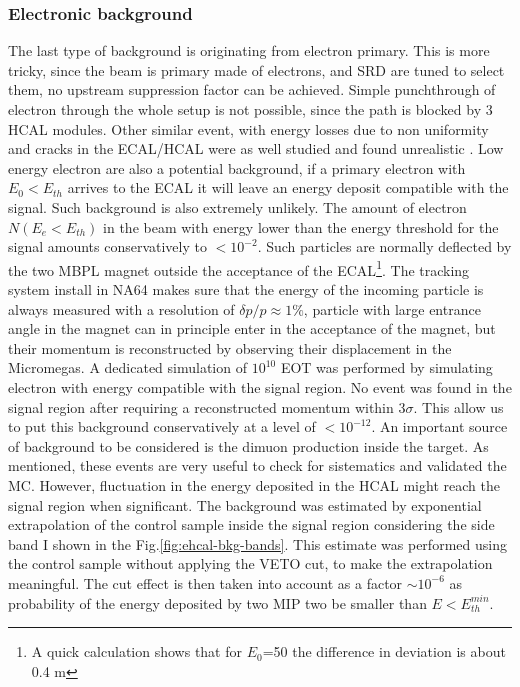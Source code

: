 \subsubsection{Electronic background}
\label{ch3:sec:bkg:inv:elec}

The last type of background is originating from electron primary. This is more tricky, since the beam is primary made of electrons, and SRD are tuned to select them, no upstream suppression factor can be achieved. Simple punchthrough of electron through the whole setup is not possible, since the path is blocked by 3 HCAL modules. Other similar event, with energy losses due to non uniformity and cracks in the ECAL/HCAL were as well studied and found unrealistic \cite{Andreas:2013lya}. Low energy electron are also a potential background, if a primary electron with $E_0 < E_{th}$ arrives to the ECAL it will leave an energy deposit compatible with the signal. Such background is also extremely unlikely. The amount of electron $N(E_e<E_{th})$ in the beam with energy lower than the energy threshold for the signal amounts conservatively to $<10^{-2}$. Such particles are normally deflected by the two MBPL magnet outside the acceptance of the ECAL\footnote{A quick calculation shows that for $E_0$=50 \gev the difference in deviation is about 0.4 \si{\meter}}. The tracking system install in NA64 makes sure that the energy of the incoming particle is always measured with a resolution of $\delta p/p \approx 1\%$, particle with large entrance angle in the magnet can in principle enter in the acceptance of the magnet, but their momentum is reconstructed by observing their displacement in the Micromegas. A dedicated simulation of $10^{10}$ EOT was performed by simulating electron with energy compatible with the signal region. No event was found in the signal region after requiring a reconstructed momentum within 3$\sigma$. This allow us to put this background conservatively at a level of $< 10^{-12}$.
An important source of background to be considered is the dimuon production inside the target. As mentioned, these events are very useful to check for sistematics and validated the MC. However, fluctuation in the energy deposited in the HCAL might reach the signal region when significant. The background was estimated by exponential extrapolation of the control sample inside the signal region considering the side band I shown in the Fig.\ref{fig:ehcal-bkg-bands}. This estimate was performed using the control sample without applying the VETO cut, to make the extrapolation meaningful. The cut effect is then taken into account as a factor $\sim 10^{-6}$ as probability of the energy deposited by two MIP two be smaller than $E<E^{min}_{th}$.


